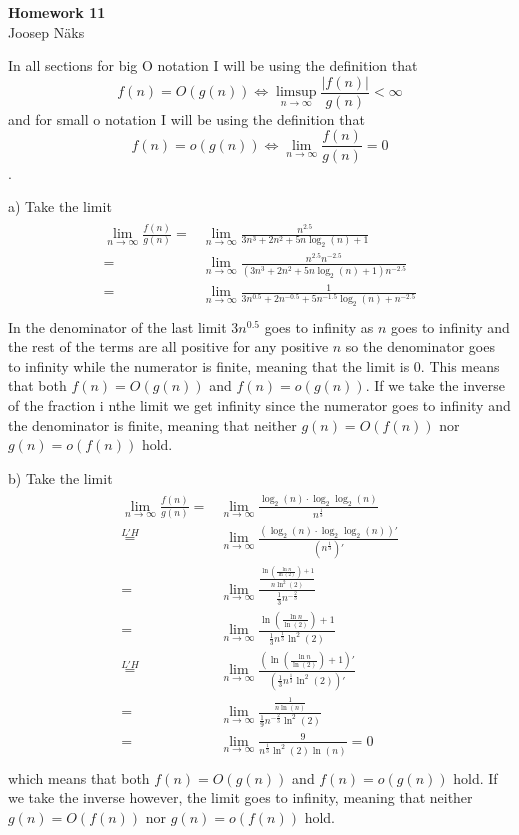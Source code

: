 \documentclass[a4paper, 10pt]{article}
\begin{document}
\begin{center}
\Large\textbf{Homework 11}\\
\small{Joosep Näks}
\end{center}

In all sections for big O notation I will be using the definition that $$f(n)=O(g(n))\Leftrightarrow\limsup_{n\to\infty}\frac{|f(n)|}{g(n)}<\infty$$ and for small o notation I will be using the definition that $$f(n)=o(g(n))\Leftrightarrow\lim_{n\to\infty}\frac{f(n)}{g(n)}=0$$.

a) Take the limit 
\begin{gather*}
\begin{aligned}
\lim_{n\to\infty}\frac{f(n)}{g(n)}=&\lim_{n\to\infty}\frac{n^{2.5}}{3n^3+2n^2+5n\log_2(n)+1}\\
=&\lim_{n\to\infty}\frac{n^{2.5}n^{-2.5}}{(3n^3+2n^2+5n\log_2(n)+1)n^{-2.5}}\\
=&\lim_{n\to\infty}\frac{1}{3n^{0.5}+2n^{-0.5}+5n^{-1.5}\log_2(n)+n^{-2.5}}\\
\end{aligned}
\end{gather*}
In the denominator of the last limit $3n^{0.5}$ goes to infinity as $n$ goes to infinity and the rest of the terms are all positive for any positive $n$ so the denominator goes to infinity while the numerator is finite, meaning that the limit is 0. This means that both $f(n)=O(g(n))$ and $f(n)=o(g(n))$. If we take the inverse of the fraction i nthe limit we get infinity since the numerator goes to infinity and the denominator is finite, meaning that neither $g(n)=O(f(n))$ nor $g(n)=o(f(n))$ hold.

b) Take the limit 
\begin{gather*}
\begin{aligned}
\lim_{n\to\infty}\frac{f(n)}{g(n)}=&\lim_{n\to\infty}\frac{\log_2(n)\cdot\log_2\log_2(n)}{n^{\frac13}}\\
\stackrel{L'H}=&\lim_{n\to\infty}\frac{(\log_2(n)\cdot\log_2\log_2(n))'}{(n^{\frac13})'}\\
=&\lim_{n\to\infty}\frac{\frac{\ln(\frac{\ln{n}}{\ln(2)})+1}{n\ln^2(2)}}{\frac13 n^{-\frac23}}\\
=&\lim_{n\to\infty}\frac{\ln(\frac{\ln{n}}{\ln(2)})+1}{\frac13n^{\frac13}\ln^2(2)}\\
\stackrel{L'H}=&\lim_{n\to\infty}\frac{(\ln(\frac{\ln{n}}{\ln(2)})+1)'}{(\frac13n^{\frac13}\ln^2(2))'}\\
=&\lim_{n\to\infty}\frac{\frac{1}{n\ln(n)}}{\frac19n^{-\frac23}\ln^2(2)}\\
=&\lim_{n\to\infty}\frac{9}{n^{\frac13}\ln^2(2)\ln(n)}=0\\
\end{aligned}
\end{gather*}
which means that both $f(n)=O(g(n))$ and $f(n)=o(g(n))$ hold. If we take the inverse however, the limit goes to infinity, meaning that neither $g(n)=O(f(n))$ nor $g(n)=o(f(n))$ hold.
\end{document}
